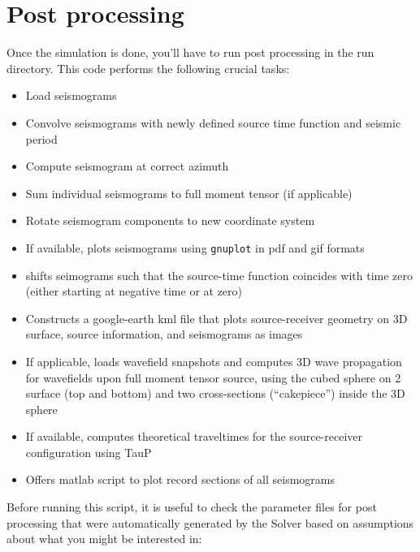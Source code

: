 \documentclass[11pt,letter,fleqn,english,notitlepage]{article}
\begin{document}
\newpage
\section{Post processing}
Once the simulation is done, you'll have to run post processing in the run
directory. This code performs the following crucial tasks:

\begin{itemize}
    \item Load seismograms
    \item Convolve seismograms with newly defined source time function and
    seismic period

    \item Compute seismogram at correct azimuth
    \item Sum individual seismograms to full moment tensor (if applicable)
    \item Rotate seismogram components to new coordinate system
    \item If available, plots seismograms using {\tt gnuplot} in pdf and gif
    formats

    \item shifts seimograms such that the source-time function coincides with
    time zero (either starting at negative time or at zero)

    \item Constructs a google-earth kml file that plots source-receiver
    geometry on 3D surface, source information, and seismograms as images

    \item If applicable, loads wavefield snapshots and computes 3D wave
    propagation for wavefields upon full moment tensor source, using the cubed
    sphere on 2 surface (top and bottom) and two cross-sections (``cakepiece'')
    inside the 3D sphere

    \item If available, computes theoretical traveltimes for the
    source-receiver configuration using TauP

    \item Offers matlab script to plot record sections of all seismograms
\end{itemize}

\noindent Before running this script, it is useful to check the parameter files
for post processing that were automatically generated by the Solver based on
assumptions about what you might be interested in:\\
\end{document}
